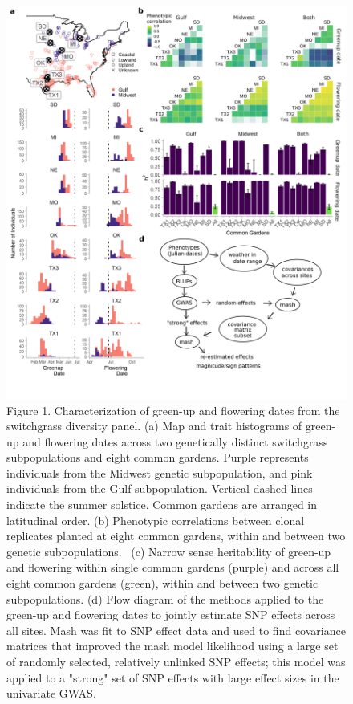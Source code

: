 \documentclass[
  9pt,
  twocolumn,
  twoside]{pnas-new}
\begin{document}
\begin{figure}[H]

{\centering \includegraphics{images/Fig1_200dpi.png}

}

\caption{Figure 1. Characterization of green-up and flowering dates from
the switchgrass diversity panel. (a) Map and trait histograms of
green-up and flowering dates across two genetically distinct switchgrass
subpopulations and eight common gardens. Purple represents individuals
from the Midwest genetic subpopulation, and pink individuals from the
Gulf subpopulation. Vertical dashed lines indicate the summer solstice.
Common gardens are arranged in latitudinal order. (b) Phenotypic
correlations between clonal replicates planted at eight common gardens,
within and between two genetic subpopulations.~ (c) Narrow sense
heritability of green-up and flowering within single common gardens
(purple) and across all eight common gardens (green), within and between
two genetic subpopulations. (d) Flow diagram of the methods applied to
the green-up and flowering dates to jointly estimate SNP effects across
all sites. Mash was fit to SNP effect data and used to find covariance
matrices that improved the mash model likelihood using a large set of
randomly selected, relatively unlinked SNP effects; this model was
applied to a "strong" set of SNP effects with large effect sizes in the
univariate GWAS.}

\end{figure}%
\end{document}
